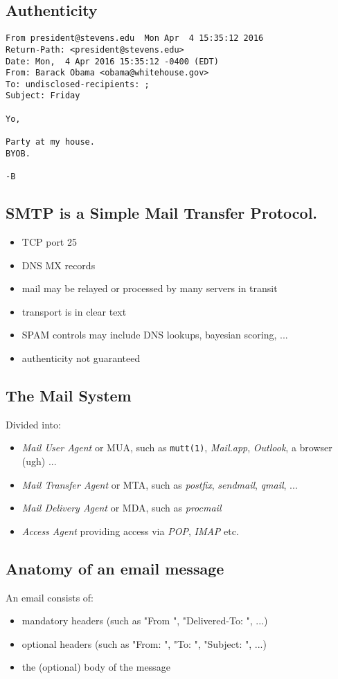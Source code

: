 \documentclass[xga]{xdvislides}
\begin{document}
\subsection{Authenticity}
\begin{verbatim}
From president@stevens.edu  Mon Apr  4 15:35:12 2016                                                
Return-Path: <president@stevens.edu>                                                                
Date: Mon,  4 Apr 2016 15:35:12 -0400 (EDT)
From: Barack Obama <obama@whitehouse.gov>
To: undisclosed-recipients: ;
Subject: Friday

Yo,

Party at my house.
BYOB.

-B
\end{verbatim}

\subsection{SMTP is a Simple Mail Transfer Protocol.}

\begin{itemize}
	\item TCP port 25
	\item DNS MX records
	\item mail may be relayed or processed by many servers in transit
	\item transport is in clear text
	\item SPAM controls may include DNS lookups, bayesian scoring, ...
	\item authenticity not guaranteed
\end{itemize}

\subsection{The Mail System}
Divided into:
\begin{itemize}
	\item {\em Mail User Agent} or MUA, such as {\tt mutt(1)}, {\em Mail.app}, {\em Outlook}, a browser (ugh) ...
	\item {\em Mail Transfer Agent} or MTA, such as {\em postfix},
		{\em sendmail}, {\em qmail}, ...
	\item {\em Mail Delivery Agent} or MDA, such as {\em procmail}
	\item {\em Access Agent} providing access via {\em POP}, {\em IMAP} etc.
\end{itemize}

\subsection{Anatomy of an email message}
An email consists of:
\begin{itemize}
	\item mandatory headers (such as "From ", "Delivered-To: ", ...)
	\item optional headers (such as "From: ", "To: ", "Subject: ", ...)
	\item the (optional) body of the message
\end{itemize}
\end{document}
